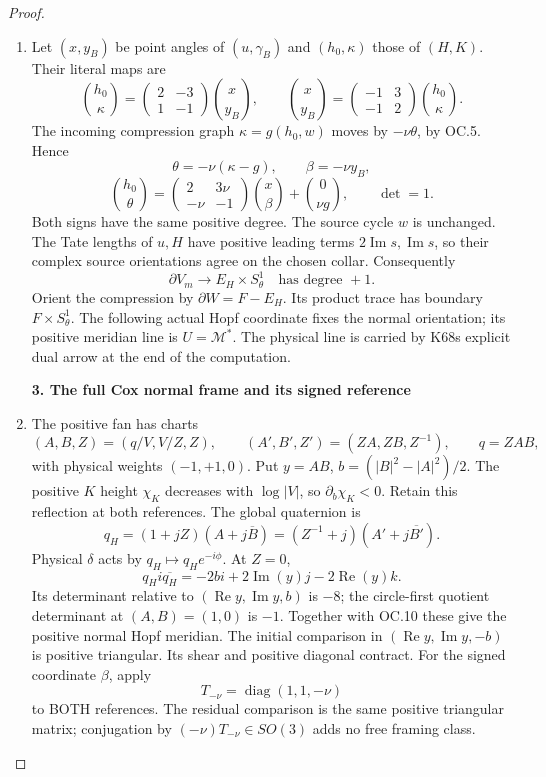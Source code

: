 \begin{proof}
\begin{enumerate}[label=\arabic*.]
\item Let \((x,y_B)\) be point angles of \((u,\gamma_B)\) and
\((h_0,\kappa)\) those of \((H,K)\). Their literal maps are
\[
\binom{h_0}{\kappa}=\begin{pmatrix}2&-3\\1&-1\end{pmatrix}
\binom{x}{y_B},\qquad
\binom{x}{y_B}=\begin{pmatrix}-1&3\\-1&2\end{pmatrix}
\binom{h_0}{\kappa}.
\tag{OC.7}
\]
The incoming compression graph \(\kappa=g(h_0,w)\) moves by
\(-\nu\theta\), by OC.5. Hence
\[
\theta=-\nu(\kappa-g),\qquad\beta=-\nu y_B,
\tag{OC.8}
\]
\[
\binom{h_0}{\theta}=\begin{pmatrix}2&3\nu\\-\nu&-1\end{pmatrix}
\binom{x}{\beta}+\binom0{\nu g},\qquad\det=1.
\tag{OC.9}
\]
Both signs have the same positive degree. The source cycle \(w\) is
unchanged. The Tate lengths of \(u,H\) have positive leading terms
\(2\operatorname{Im}s,\operatorname{Im}s\), so their complex source
orientations agree on the chosen collar. Consequently
\[
\partial V_m\longrightarrow E_H\times S^1_\theta
\quad\text{has degree }+1.
\tag{OC.10}
\]
Orient the compression by \(\partial W=F-E_H\). Its product trace
has boundary \(F\times S^1_\theta\). The following actual Hopf
coordinate fixes the normal orientation; its positive meridian
line is \(U=\mathcal M^*\). The physical line is carried by K68\textquotesingle s
explicit dual arrow at the end of the computation.

\par

\medskip\noindent\textbf{3. The full Cox normal frame and its signed reference}

\par\nobreak

\item The positive fan has charts
\[
(A,B,Z)=(q/V,V/Z,Z),\qquad
(A',B',Z')=(ZA,ZB,Z^{-1}),\qquad q=ZAB,
\tag{OC.11}
\]
with physical weights \((-1,+1,0)\). Put
\(y=AB\), \(b=(|B|^2-|A|^2)/2\). The positive \(K\) height
\(\chi_K\) decreases with \(\log|V|\), so
\(\partial_b\chi_K<0\). Retain this reflection at both references.
The global quaternion is
\[
q_H=(1+jZ)(A+j\overline B)
       =(Z^{-1}+j)(A'+j\overline{B'}).
\tag{OC.12}
\]
Physical \(\delta\) acts by \(q_H\mapsto q_He^{-i\phi}\).
At \(Z=0\),
\[
q_Hi\overline{q_H}=-2bi+2\operatorname{Im}(y)j
                               -2\operatorname{Re}(y)k.
\tag{OC.13}
\]
Its determinant relative to \((\operatorname{Re}y,\operatorname{Im}y,b)\)
is \(-8\); the circle-first quotient determinant at \((A,B)=(1,0)\)
is \(-1\). Together with OC.10 these give the positive normal
Hopf meridian. The initial comparison in
\((\operatorname{Re}y,\operatorname{Im}y,-b)\) is positive triangular.
Its shear and positive diagonal contract. For the signed coordinate
\(\beta\), apply
\[
T_{-\nu}=\operatorname{diag}(1,1,-\nu)
\tag{OC.14}
\]
to BOTH references. The residual comparison is the same positive
triangular matrix; conjugation by \((-\nu)T_{-\nu}\in SO(3)\)
adds no free framing class.


\end{enumerate}
\end{proof}
